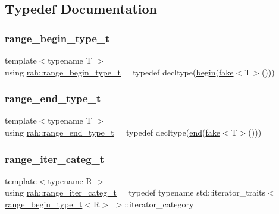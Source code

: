 \subsection{Typedef Documentation}
\mbox{\label{namespacerah_a28aff4eeddcece6be65ff0b956d32d4a}} 
\subsubsection{\texorpdfstring{range\_begin\_type\_t}{range\_begin\_type\_t}}
{\footnotesize\ttfamily template$<$typename T $>$ \\
using \mbox{\hyperlink{namespacerah_a28aff4eeddcece6be65ff0b956d32d4a}{rah\+::range\+\_\+begin\+\_\+type\+\_\+t}} = typedef decltype(\mbox{\hyperlink{namespacerah_a2c4a19e57cc4e0753e93830f247def6d}{begin}}(\mbox{\hyperlink{namespacerah_a11785bbdf970efa1bc57fc14993b77bf}{fake}}$<$T$>$()))}

\mbox{\label{namespacerah_a9657e24ae477f4482225b133fe286b65}} 
\subsubsection{\texorpdfstring{range\_end\_type\_t}{range\_end\_type\_t}}
{\footnotesize\ttfamily template$<$typename T $>$ \\
using \mbox{\hyperlink{namespacerah_a9657e24ae477f4482225b133fe286b65}{rah\+::range\+\_\+end\+\_\+type\+\_\+t}} = typedef decltype(\mbox{\hyperlink{namespacerah_aaddd1442cd76b96876e692cdefe7261d}{end}}(\mbox{\hyperlink{namespacerah_a11785bbdf970efa1bc57fc14993b77bf}{fake}}$<$T$>$()))}

\mbox{\label{namespacerah_aff9b9a5748e293f6a1726308c1ac1a01}} 
\subsubsection{\texorpdfstring{range\_iter\_categ\_t}{range\_iter\_categ\_t}}
{\footnotesize\ttfamily template$<$typename R $>$ \\
using \mbox{\hyperlink{namespacerah_aff9b9a5748e293f6a1726308c1ac1a01}{rah\+::range\+\_\+iter\+\_\+categ\+\_\+t}} = typedef typename std\+::iterator\+\_\+traits$<$\mbox{\hyperlink{namespacerah_a28aff4eeddcece6be65ff0b956d32d4a}{range\+\_\+begin\+\_\+type\+\_\+t}}$<$R$>$ $>$\+::iterator\+\_\+category}

